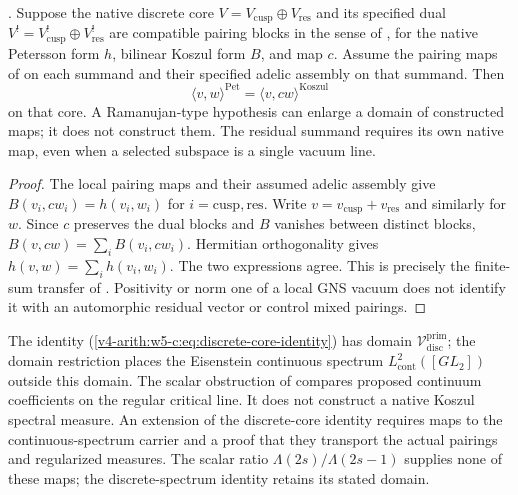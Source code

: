 \begin{theorem}
\label{v4-arith:w5-c:thm:discrete-core-identity}
\ClaimStatusProvedHereConditional. Suppose the native discrete core
$V=V_{\mathrm{cusp}}\oplus V_{\mathrm{res}}$ and its specified dual
$V^!=V_{\mathrm{cusp}}^!\oplus V_{\mathrm{res}}^!$ are compatible
pairing blocks in the sense of
, for the native
Petersson form $h$, bilinear Koszul form $B$, and map $c$.
Assume the pairing maps of
 on each summand and their
specified adelic assembly on that summand. Then
\begin{equation}
 \langle v,w\rangle^{\mathrm{Pet}}
    =\langle v,cw\rangle^{\mathrm{Koszul}}
 \label{v4-arith:w5-c:eq:discrete-core-identity}
\end{equation}
on that core. A Ramanujan-type hypothesis can enlarge a domain
of constructed maps; it does not construct them. The residual
summand requires its own native map, even when a selected
subspace is a single vacuum line.
\end{theorem}
\begin{proof}
The local pairing maps and their assumed adelic assembly give
$B(v_i,cw_i)=h(v_i,w_i)$ for $i=\mathrm{cusp},\mathrm{res}$.
Write $v=v_{\mathrm{cusp}}+v_{\mathrm{res}}$ and similarly for $w$.
Since $c$ preserves the dual blocks and $B$ vanishes between
distinct blocks, $B(v,cw)=\sum_iB(v_i,cw_i)$.
Hermitian orthogonality gives $h(v,w)=\sum_i h(v_i,w_i)$.
The two expressions agree. This is precisely the finite-sum
transfer of .
Positivity or norm one of a local GNS vacuum does not identify
it with an automorphic residual vector or control mixed pairings.
\end{proof}

\begin{remark}
\label{v4-arith:w5-c:rem:eisenstein-placement}
The identity (\ref{v4-arith:w5-c:eq:discrete-core-identity}) has domain
\(\mathcal{V}^{\mathrm{prim}}_{\mathrm{disc}}\); the domain restriction
places the Eisenstein continuous spectrum
\(L^{2}_{\mathrm{cont}}([GL_{2}])\) outside this domain.
The scalar obstruction of 
compares proposed continuum coefficients on the regular critical
line. It does not construct a native Koszul spectral measure.
An extension of the discrete-core identity requires maps to the
continuous-spectrum carrier and a proof that they transport the
actual pairings and regularized measures. The scalar ratio
\(\Lambda(2s)/\Lambda(2s-1)\) supplies none of these maps;
the discrete-spectrum identity retains its stated domain.
\end{remark}

